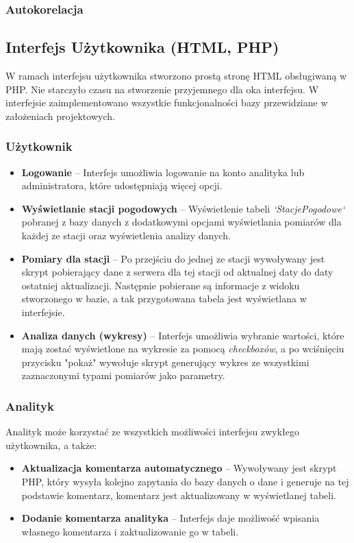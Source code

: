 \documentclass[12pt,a4paper]{article}
\begin{document}
\subsubsection{Autokorelacja}
\subsection{Interfejs Użytkownika (HTML, PHP)}
W ramach interfejsu użytkownika stworzono prostą stronę HTML obsługiwaną w PHP. Nie starczyło czasu na stworzenie przyjemnego dla oka interfejsu. W interfejsie zaimplementowano wszystkie funkcjonalności bazy przewidziane w założeniach projektowych.
\subsubsection{Użytkownik}
\begin{itemize}
\item \textbf{Logowanie} -- Interfejs umożliwia logowanie na konto analityka lub administratora, które udostępniają więcej opcji.
\item \textbf{Wyświetlanie stacji pogodowych} -- Wyświetlenie tabeli \textit{`StacjePogodowe`} pobranej z bazy danych z dodatkowymi opcjami wyświetlania pomiarów dla każdej ze stacji oraz wyświetlenia analizy danych.
\item \textbf{Pomiary dla stacji} -- Po przejściu do jednej ze stacji wywoływany jest skrypt pobierający dane z serwera dla tej stacji od aktualnej daty do daty ostatniej aktualizacji. Następnie pobierane są informacje z widoku stworzonego w bazie, a tak przygotowana tabela jest wyświetlana w interfejsie.
\item \textbf{Analiza danych (wykresy)} -- Interfejs umożliwia wybranie wartości, które mają zostać wyświetlone na wykresie za pomocą \textit{checkboxów}, a po wciśnięciu przycisku "pokaż" wywołuje skrypt generujący wykres ze wszystkimi zaznaczonymi typami pomiarów jako parametry.
\end{itemize}
\subsubsection{Analityk}
Analityk może korzystać ze wszystkich możliwości interfejsu zwykłego użytkownika, a także:
\begin{itemize}
\item \textbf{Aktualizacja komentarza automatycznego} -- Wywoływany jest skrypt PHP, który wysyła kolejno zapytania do bazy danych o dane i generuje na tej podstawie komentarz, komentarz jest aktualizowany w wyświetlanej tabeli.
\item \textbf{Dodanie komentarza analityka} -- Interfejs daje możliwość wpisania własnego komentarza i zaktualizowanie go w tabeli.
\end{itemize}
\end{document}
